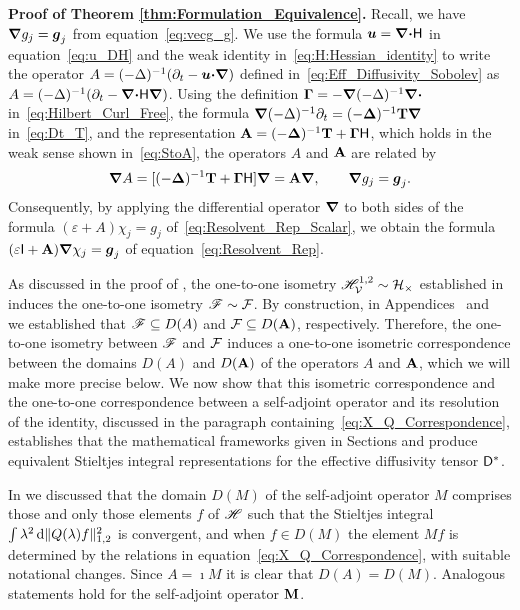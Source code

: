 \documentclass[amsa]{ipart}
\begin{document}
\textbf{Proof of Theorem \ref{thm:Formulation_Equivalence}.}\hspace{1ex}
%
Recall, we have $\mbox{\boldmath${\nabla}$}
g_j=\boldsymbol{g}_j$ from equation~\eqref{eq:vecg_g}.
We use the formula $\boldsymbol{u} =\mbox{\boldmath${\nabla}$} \mbox{\boldmath${\cdot}$}\mathsf{H}$ in equation~\eqref{eq:u_DH}
and the weak identity in~\eqref{eq:H:Hessian_identity} to write the
operator $A=(-\Delta)^{-1}(\partial_t-\boldsymbol{u}\mbox{\boldmath${\cdot}$}\mbox{\boldmath${\nabla}$})$ defined
in~\eqref{eq:Eff_Diffusivity_Sobolev} as 
$A=(-\Delta)^{-1}(\partial_t-\mbox{\boldmath${\nabla}$} \mbox{\boldmath${\cdot}$}\mathsf{H}\mbox{\boldmath${\nabla}$})$.   Using the 
definition $\mbox{\boldmath${\Gamma}$}=-\mbox{\boldmath${\nabla}$} (-\Delta)^{-1}\mbox{\boldmath${\nabla}$} \mbox{\boldmath${\cdot}$}$
in~\eqref{eq:Hilbert_Curl_Free}, the formula
$\mbox{\boldmath${\nabla}$}(-\Delta)^{-1}\partial_t=(-\mbox{\boldmath${\Delta}$})^{-1}\mathbf{T}\mbox{\boldmath${\nabla}$} \,$
in~\eqref{eq:Dt_T}, and the representation
$\mathbf{A}=(-\mbox{\boldmath${\Delta}$})^{-1}\mathbf{T}+\mbox{\boldmath${\Gamma}$}\mathsf{H}$, which holds in the weak sense
shown in~\eqref{eq:StoA}, the operators $A$ and $\mathbf{A}$ are related by
%
\begin{align}\label{eq:A_Ab_Relation}
  \bnabla A=[(-\bDelta)^{-1}\Tb+\bGamma\Hm]\bnabla =\Ab\bnabla , \qquad
  \bnabla g_j=\vecg_j.
\end{align}
%
Consequently, by applying the
differential operator $\mbox{\boldmath${\nabla}$} $ to both sides of the formula
$(\varepsilon+A)\chi_j=g_j$ of~\eqref{eq:Resolvent_Rep_Scalar}, we obtain the
formula  $(\varepsilon\mathsf{I}+\mathbf{A})\mbox{\boldmath${\nabla}$} \chi_j=\boldsymbol{g}_j$ of
equation~\eqref{eq:Resolvent_Rep}. 






As discussed in the proof of , the
one-to-one isometry $\mathscr{H}^{1,2}_{\mathcal{V}}\sim\mathcal{H}_\times$ established in
 induces the one-to-one isometry 
$\mathscr{F}\sim\mathcal{F}$. By construction, in
Appendices~
and~ we established that $\mathscr{F}\subseteq D(A)$
and $\mathcal{F}\subseteq D(\mathbf{A})$, respectively. Therefore, the
one-to-one isometry between $\mathscr{F}$ and $\mathcal{F}$ induces a one-to-one
isometric correspondence between the domains $D(A)$ and $D(\mathbf{A})$ of
the operators $A$ and $\mathbf{A}$, which we will make more precise below. We
now show that this isometric correspondence and the one-to-one
correspondence between a self-adjoint operator and its resolution of
the identity, discussed in the paragraph
containing~\eqref{eq:X_Q_Correspondence}, establishes that the 
mathematical frameworks given in Sections
 and 
produce equivalent Stieltjes integral representations for the
effective diffusivity tensor $\mathsf{D}^*$. 


In  we discussed that the domain $D(M)$ of
the self-adjoint operator $M$ comprises those and only those elements
$f$ of $\mathscr{H}$ such 
that the Stieltjes integral $\int\lambda^2\,\mathrm{d}\|Q(\lambda)f\|_{1,2}^2$ is convergent,
and when $f\in D(M)$ the element $Mf$ is determined by the relations in 
equation~\eqref{eq:X_Q_Correspondence}, with suitable notational
changes. Since $A=\imath M$ it is clear that $D(A)=D(M)$. Analogous
statements hold for the self-adjoint operator $\mathbf{M}$. 
\end{document}
